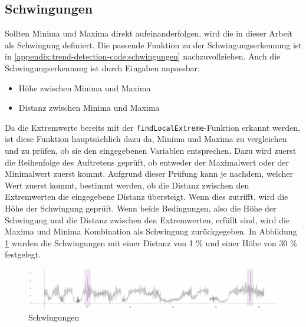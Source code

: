 \subsection{Schwingungen}
Sollten Minima und Maxima direkt aufeinanderfolgen, wird die in dieser Arbeit als Schwingung definiert. Die passende Funktion zu der Schwingungserkennung ist in \ref{appendix:trend-detection-code:schwingungen} nachzuvollziehen. Auch die Schwingungserkennung ist durch Eingaben anpassbar:
\begin{itemize}
    \item Höhe zwischen Minima und Maxima
    \item Distanz zwischen Minima und Maxima
\end{itemize}
Da die Extremwerte bereits mit der \texttt{findLocalExtreme}-Funktion erkannt werden, ist diese Funktion hauptsächlich dazu da, Minima und Maxima zu vergleichen und zu prüfen, ob sie den eingegebenen Variablen entsprechen. Dazu wird zuerst die Reihenfolge des Auftretens geprüft, ob entweder der Maximalwert oder der Minimalwert zuerst kommt. Aufgrund dieser Prüfung kann je nachdem, welcher Wert zuerst kommt, bestimmt werden, ob die Distanz zwischen den Extremwerten die eingegebene Distanz übersteigt. Wenn dies zutrifft, wird die Höhe der Schwingung geprüft. Wenn beide Bedingungen, also die Höhe der Schwingung und die Distanz zwischen den Extremwerten, erfüllt sind, wird die Maxima und Minima Kombination als Schwingung zurückgegeben. In Abbildung \ref{fig:vibrations} wurden die Schwingungen mit einer Distanz von 1 \% und einer Höhe von 30 \% festgelegt. 
\begin{figure}[h!]
\centering
\includegraphics[width=\textwidth]{gfx/vibrations.png}
\caption{Schwingungen}
\label{fig:vibrations}
\end{figure}

